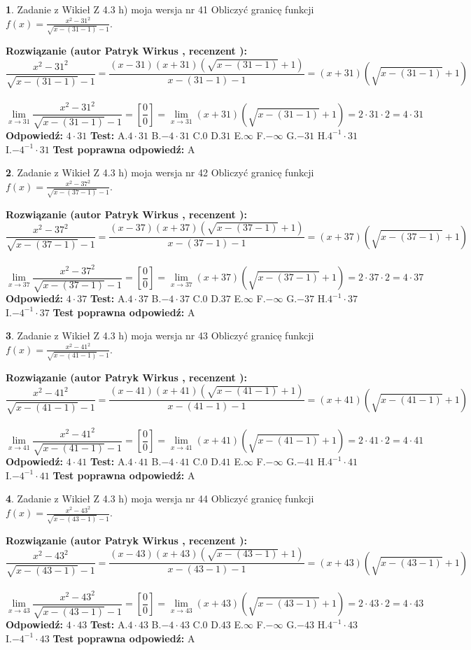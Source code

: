 \documentclass[12pt, a4paper]{article}
\theoremstyle{definition} %
\newtheorem{zad}{}
\newcommand{\zadStart}[1]{\begin{zad}#1\newline}
\newcommand{\zadStop}{\end{zad}}
\newcommand{\rozwStart}[2]{\noindent \textbf{Rozwiązanie (autor #1 , recenzent #2): }\newline}
\newcommand{\rozwStop}{\newline}
\newcommand{\odpStart}{\noindent \textbf{Odpowiedź:}\newline}
\newcommand{\odpStop}{\newline}
\newcommand{\testStart}{\noindent \textbf{Test:}\newline}
\newcommand{\testStop}{\newline}
\newcommand{\kluczStart}{\noindent \textbf{Test poprawna odpowiedź:}\newline}
\newcommand{\kluczStop}{\newline}
\begin{document}
\zadStart{Zadanie z Wikieł Z 4.3 h) moja wersja nr 41}
Obliczyć granicę funkcji $f(x)=\frac{x^{2} - 31^{2}}{\sqrt{x-(31-1)}-1}$.
\zadStop
\rozwStart{Patryk Wirkus}{}
$$\frac{x^{2} - 31^{2}}{\sqrt{x-(31-1)}-1}=\frac{(x-31)(x+31)(\sqrt{x-(31-1)}+1)}{x-(31-1)-1}=(x+31)(\sqrt{x-(31-1)}+1)$$
\\
$$\lim\limits_{x\to 31}\frac{x^{2} - 31^{2}}{\sqrt{x-(31-1)}-1}=[\frac{0}{0}]=
\lim\limits_{x\to 31}(x+31)(\sqrt{x-(31-1)}+1) = 2\cdot31 \cdot 2 = 4 \cdot 31$$
\rozwStop
\odpStart
$4\cdot31$
\odpStop
\testStart
A.$4\cdot31$
B.$-4\cdot31$
C.$0$
D.$31$
E.$\infty$
F.$-\infty$
G.$-31$
H.$4^{-1}\cdot31$
I.$-4^{-1}\cdot31$
\testStop
\kluczStart
A
\kluczStop



\zadStart{Zadanie z Wikieł Z 4.3 h) moja wersja nr 42}
Obliczyć granicę funkcji $f(x)=\frac{x^{2} - 37^{2}}{\sqrt{x-(37-1)}-1}$.
\zadStop
\rozwStart{Patryk Wirkus}{}
$$\frac{x^{2} - 37^{2}}{\sqrt{x-(37-1)}-1}=\frac{(x-37)(x+37)(\sqrt{x-(37-1)}+1)}{x-(37-1)-1}=(x+37)(\sqrt{x-(37-1)}+1)$$
\\
$$\lim\limits_{x\to 37}\frac{x^{2} - 37^{2}}{\sqrt{x-(37-1)}-1}=[\frac{0}{0}]=
\lim\limits_{x\to 37}(x+37)(\sqrt{x-(37-1)}+1) = 2\cdot37 \cdot 2 = 4 \cdot 37$$
\rozwStop
\odpStart
$4\cdot37$
\odpStop
\testStart
A.$4\cdot37$
B.$-4\cdot37$
C.$0$
D.$37$
E.$\infty$
F.$-\infty$
G.$-37$
H.$4^{-1}\cdot37$
I.$-4^{-1}\cdot37$
\testStop
\kluczStart
A
\kluczStop



\zadStart{Zadanie z Wikieł Z 4.3 h) moja wersja nr 43}
Obliczyć granicę funkcji $f(x)=\frac{x^{2} - 41^{2}}{\sqrt{x-(41-1)}-1}$.
\zadStop
\rozwStart{Patryk Wirkus}{}
$$\frac{x^{2} - 41^{2}}{\sqrt{x-(41-1)}-1}=\frac{(x-41)(x+41)(\sqrt{x-(41-1)}+1)}{x-(41-1)-1}=(x+41)(\sqrt{x-(41-1)}+1)$$
\\
$$\lim\limits_{x\to 41}\frac{x^{2} - 41^{2}}{\sqrt{x-(41-1)}-1}=[\frac{0}{0}]=
\lim\limits_{x\to 41}(x+41)(\sqrt{x-(41-1)}+1) = 2\cdot41 \cdot 2 = 4 \cdot 41$$
\rozwStop
\odpStart
$4\cdot41$
\odpStop
\testStart
A.$4\cdot41$
B.$-4\cdot41$
C.$0$
D.$41$
E.$\infty$
F.$-\infty$
G.$-41$
H.$4^{-1}\cdot41$
I.$-4^{-1}\cdot41$
\testStop
\kluczStart
A
\kluczStop



\zadStart{Zadanie z Wikieł Z 4.3 h) moja wersja nr 44}
Obliczyć granicę funkcji $f(x)=\frac{x^{2} - 43^{2}}{\sqrt{x-(43-1)}-1}$.
\zadStop
\rozwStart{Patryk Wirkus}{}
$$\frac{x^{2} - 43^{2}}{\sqrt{x-(43-1)}-1}=\frac{(x-43)(x+43)(\sqrt{x-(43-1)}+1)}{x-(43-1)-1}=(x+43)(\sqrt{x-(43-1)}+1)$$
\\
$$\lim\limits_{x\to 43}\frac{x^{2} - 43^{2}}{\sqrt{x-(43-1)}-1}=[\frac{0}{0}]=
\lim\limits_{x\to 43}(x+43)(\sqrt{x-(43-1)}+1) = 2\cdot43 \cdot 2 = 4 \cdot 43$$
\rozwStop
\odpStart
$4\cdot43$
\odpStop
\testStart
A.$4\cdot43$
B.$-4\cdot43$
C.$0$
D.$43$
E.$\infty$
F.$-\infty$
G.$-43$
H.$4^{-1}\cdot43$
I.$-4^{-1}\cdot43$
\testStop
\kluczStart
A
\kluczStop
\end{document}

